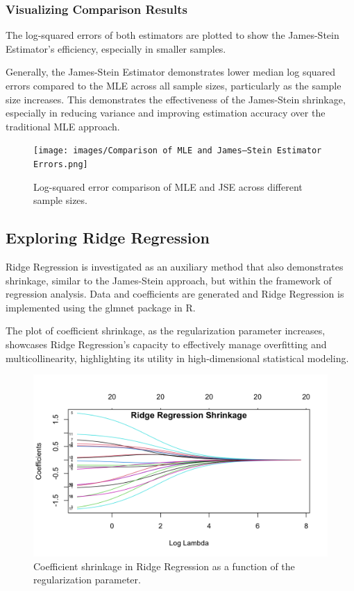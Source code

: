 \subsubsection{Visualizing Comparison Results}

The log-squared errors of both estimators are plotted to show the James-Stein Estimator's efficiency, especially in smaller samples.

Generally, the James-Stein Estimator demonstrates lower median log squared errors compared to the MLE across all sample sizes, particularly as the sample size increases. This demonstrates the effectiveness of the James-Stein shrinkage, especially in reducing variance and improving estimation accuracy over the traditional MLE approach.

\begin{figure}[H]
    \centering
    \texttt{[image: images/Comparison of MLE and James–Stein Estimator Errors.png]}
    \caption{Log-squared error comparison of MLE and JSE across different sample sizes.}
    \label{fig:estimators_comparison}
\end{figure}

\subsection{Exploring Ridge Regression}

Ridge Regression is investigated as an auxiliary method that also demonstrates shrinkage, similar to the James-Stein approach, but within the framework of regression analysis. Data and coefficients are generated and Ridge Regression is implemented using the glmnet package in R.

The plot of coefficient shrinkage, as the regularization parameter increases, showcases Ridge Regression's capacity to effectively manage overfitting and multicollinearity, highlighting its utility in high-dimensional statistical modeling.

\begin{figure}[H]
    \centering
    \includegraphics[width=1\textwidth]{images/Ridge Regression Shrinkage.png}
    \caption{Coefficient shrinkage in Ridge Regression as a function of the regularization parameter.}
    \label{fig:ridge_shrinkage}
\end{figure}


